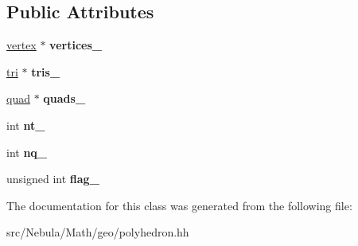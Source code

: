 \subsection*{Public Attributes}
\begin{DoxyCompactItemize}
\item 
\hypertarget{classmath_1_1geo_1_1polyhedron_a95b429bd2b0b049560fc008563663b17}{\hyperlink{classmath_1_1geo_1_1vertex}{vertex} $\ast$ {\bfseries vertices\-\_\-}}\label{classmath_1_1geo_1_1polyhedron_a95b429bd2b0b049560fc008563663b17}

\item 
\hypertarget{classmath_1_1geo_1_1polyhedron_a1f3a59fa6add8c59eea9deea460c3c96}{\hyperlink{classmath_1_1geo_1_1tri}{tri} $\ast$ {\bfseries tris\-\_\-}}\label{classmath_1_1geo_1_1polyhedron_a1f3a59fa6add8c59eea9deea460c3c96}

\item 
\hypertarget{classmath_1_1geo_1_1polyhedron_aece41abb7f5005d9ff6de2016aae790c}{\hyperlink{classmath_1_1geo_1_1quad}{quad} $\ast$ {\bfseries quads\-\_\-}}\label{classmath_1_1geo_1_1polyhedron_aece41abb7f5005d9ff6de2016aae790c}

\item 
\hypertarget{classmath_1_1geo_1_1polyhedron_ab8bbfdd91290c53d8f8e0c55c3f11fdd}{int {\bfseries nt\-\_\-}}\label{classmath_1_1geo_1_1polyhedron_ab8bbfdd91290c53d8f8e0c55c3f11fdd}

\item 
\hypertarget{classmath_1_1geo_1_1polyhedron_ac5bbb1b818226c30b4f8ea39006efa57}{int {\bfseries nq\-\_\-}}\label{classmath_1_1geo_1_1polyhedron_ac5bbb1b818226c30b4f8ea39006efa57}

\item 
\hypertarget{classmath_1_1geo_1_1polyhedron_a962cdc8309c56bd40a34c3af223d6fd3}{unsigned int {\bfseries flag\-\_\-}}\label{classmath_1_1geo_1_1polyhedron_a962cdc8309c56bd40a34c3af223d6fd3}

\end{DoxyCompactItemize}


The documentation for this class was generated from the following file\-:\begin{DoxyCompactItemize}
\item 
src/\-Nebula/\-Math/geo/polyhedron.\-hh\end{DoxyCompactItemize}
